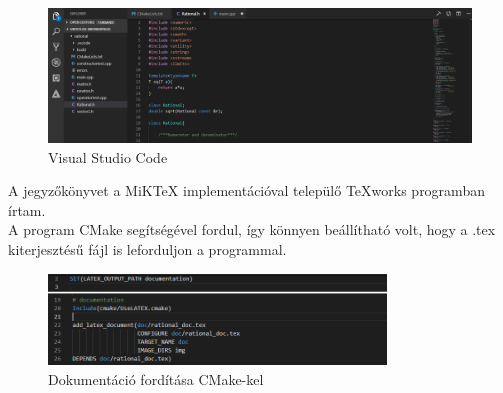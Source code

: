 \documentclass[a4paper, 12pt]{article}
\begin{document}
\begin{figure}[h!]
\includegraphics[width=1\textwidth]{vscode.png}
\caption{ Visual Studio Code}
\end{figure}
\newpage
\noindent
A jegyzőkönyvet a MiKTeX implementációval települő TeXworks programban írtam.\\
A program CMake segítségével fordul, így könnyen beállítható volt, hogy a .tex kiterjesztésű fájl is leforduljon a programmal.
\begin{figure}[h!]
\centering
\includegraphics[width=0.8\textwidth]{cmake.png}
\caption{Dokumentáció fordítása CMake-kel}
\end{figure}
\end{document}
